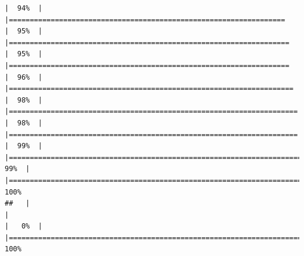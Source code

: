 \documentclass[
  english,
  man,a4paper,mask,floatsintext]{apa6}
\begin{document}
\begin{verbatim}
|  94%  |                                                                              |==================================================================    |  95%  |                                                                              |===================================================================   |  95%  |                                                                              |===================================================================   |  96%  |                                                                              |====================================================================  |  98%  |                                                                              |===================================================================== |  98%  |                                                                              |===================================================================== |  99%  |                                                                              |======================================================================|  99%  |                                                                              |======================================================================| 100%
##   |                                                                              |                                                                      |   0%  |                                                                              |======================================================================| 100%

\end{verbatim}
\end{document}
